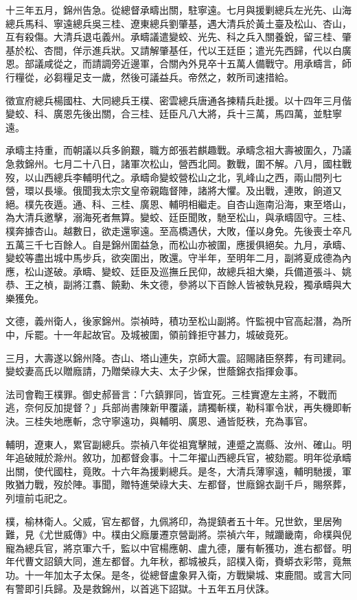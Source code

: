 \begin{pinyinscope}
十三年五月，錦州告急。從總督承疇出關，駐寧遠。七月與援剿總兵左光先、山海總兵馬科、寧遠總兵吳三桂、遼東總兵劉肇基，遇大清兵於黃土臺及松山、杏山，互有殺傷。大清兵退屯義州。承疇議遣變蛟、光先、科之兵入關養銳，留三桂、肇基於松、杏間，佯示進兵狀。又請解肇基任，代以王廷臣；遣光先西歸，代以白廣恩。部議咸從之，而請調旁近邊軍，合關內外見卒十五萬人備戰守。用承疇言，師行糧從，必芻糧足支一歲，然後可議益兵。帝然之，敕所司速措給。

徵宣府總兵楊國柱、大同總兵王樸、密雲總兵唐通各揀精兵赴援。以十四年三月偕變蛟、科、廣恩先後出關，合三桂、廷臣凡八大將，兵十三萬，馬四萬，並駐寧遠。

承疇主持重，而朝議以兵多餉艱，職方郎張若麒趣戰。承疇念祖大壽被圍久，乃議急救錦州。七月二十八日，諸軍次松山，營西北岡。數戰，圍不解。八月，國柱戰歿，以山西總兵李輔明代之。承疇命變蛟營松山之北，乳峰山之西，兩山間列七營，環以長壕。俄聞我太宗文皇帝親臨督陣，諸將大懼。及出戰，連敗，餉道又絕。樸先夜遁。通、科、三桂、廣恩、輔明相繼走。自杏山迤南沿海，東至塔山，為大清兵邀擊，溺海死者無算。變蛟、廷臣聞敗，馳至松山，與承疇固守。三桂、樸奔據杏山。越數日，欲走還寧遠。至高橋遇伏，大敗，僅以身免。先後喪士卒凡五萬三千七百餘人。自是錦州圍益急，而松山亦被圍，應援俱絕矣。九月，承疇、變蛟等盡出城中馬步兵，欲突圍出，敗還。守半年，至明年二月，副將夏成德為內應，松山遂破。承疇、變蛟、廷臣及巡撫丘民仰，故總兵祖大樂，兵備道張斗、姚恭、王之楨，副將江翥、饒勳、朱文德，參將以下百餘人皆被執見殺，獨承疇與大樂獲免。

文德，義州衛人，後家錦州。崇禎時，積功至松山副將。忤監視中官高起潛，為所中，斥罷。十一年起故官。及城被圍，領前鋒拒守甚力，城破竟死。

三月，大壽遂以錦州降。杏山、塔山連失，京師大震。詔賜諸臣祭葬，有司建祠。變蛟妻高氏以贈廕請，乃贈榮祿大夫、太子少保，世蔭錦衣指揮僉事。

法司會鞫王樸罪。御史郝晉言：「六鎮罪同，皆宜死。三桂實遼左主將，不戰而逃，奈何反加提督？」兵部尚書陳新甲覆議，請獨斬樸，勒科軍令狀，再失機即斬決。三桂失地應斬，念守寧遠功，與輔明、廣恩、通皆貶秩，充為事官。

輔明，遼東人，累官副總兵。崇禎八年從祖寬擊賊，連蹙之嵩縣、汝州、確山。明年追破賊於滁州。敘功，加都督僉事。十二年擢山西總兵官，被劾罷。明年從承疇出關，使代國柱，竟敗。十六年為援剿總兵。是冬，大清兵薄寧遠，輔明馳援，軍敗猶力戰，歿於陣。事聞，贈特進榮祿大夫、左都督，世廕錦衣副千戶，賜祭葬，列壇前屯祀之。

樸，榆林衛人。父威，官左都督，九佩將印，為提鎮者五十年。兄世欽，里居殉難，見《尤世威傳》中。樸由父廕屢遷京營副將。崇禎六年，賊躪畿南，命樸與倪寵為總兵官，將京軍六千，監以中官楊應朝、盧九德，屢有斬獲功，進右都督。明年代曹文詔鎮大同，進左都督。九年秋，都城被兵，詔樸入衛，賚蟒衣彩幣，竟無功。十一年加太子太保。是冬，從總督盧象昇入衛，方戰欒城、束鹿間。或言大同有警即引兵歸。及是救錦州，以首逃下詔獄。十五年五月伏誅。


\end{pinyinscope}
